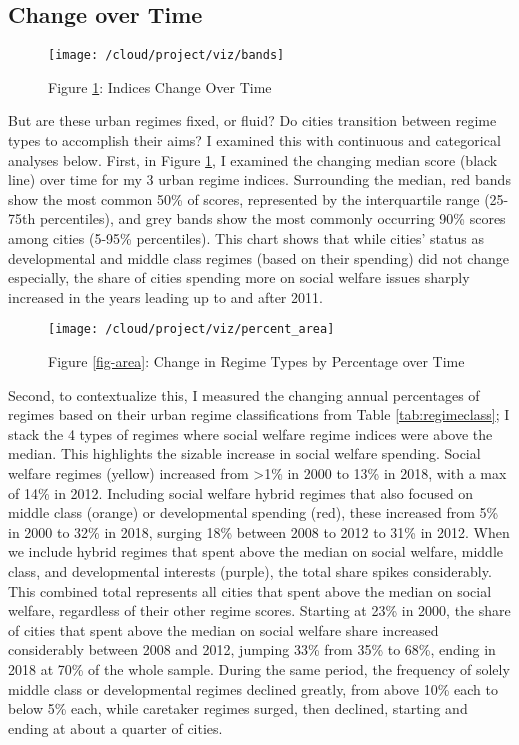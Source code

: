 \documentclass[preprint, 3p,
authoryear]{elsarticle} %
\begin{document}
\hypertarget{change-over-time}{%
\subsection{Change over Time}\label{change-over-time}}

\begin{figure}
\texttt{[image: /cloud/project/viz/bands]} \caption{Figure \ref{fig:bands}\label{fig:bands}: Indices Change Over Time}\label{fig:bands}
\end{figure}

But are these urban regimes fixed, or fluid? Do cities transition
between regime types to accomplish their aims? I examined this with
continuous and categorical analyses below. First, in Figure
\ref{fig:bands}, I examined the changing median score (black line) over
time for my 3 urban regime indices. Surrounding the median, red bands
show the most common 50\% of scores, represented by the interquartile
range (25-75th percentiles), and grey bands show the most commonly
occurring 90\% scores among cities (5-95\% percentiles). This chart
shows that while cities' status as developmental and middle class
regimes (based on their spending) did not change especially, the share
of cities spending more on social welfare issues sharply increased in
the years leading up to and after 2011.

\begin{figure}
\texttt{[image: /cloud/project/viz/percent\_area]} \caption{Figure \ref{fig-area}\label{fig-area}: Change in Regime Types by Percentage over Time}\label{fig:area}
\end{figure}

Second, to contextualize this, I measured the changing annual
percentages of regimes based on their urban regime classifications from
Table \ref{tab:regimeclass}; I stack the 4 types of regimes where social
welfare regime indices were above the median. This highlights the
sizable increase in social welfare spending. Social welfare regimes
(yellow) increased from \textgreater1\% in 2000 to 13\% in 2018, with a
max of 14\% in 2012. Including social welfare hybrid regimes that also
focused on middle class (orange) or developmental spending (red), these
increased from 5\% in 2000 to 32\% in 2018, surging 18\% between 2008 to
2012 to 31\% in 2012. When we include hybrid regimes that spent above
the median on social welfare, middle class, and developmental interests
(purple), the total share spikes considerably. This combined total
represents all cities that spent above the median on social welfare,
regardless of their other regime scores. Starting at 23\% in 2000, the
share of cities that spent above the median on social welfare share
increased considerably between 2008 and 2012, jumping 33\% from 35\% to
68\%, ending in 2018 at 70\% of the whole sample. During the same
period, the frequency of solely middle class or developmental regimes
declined greatly, from above 10\% each to below 5\% each, while
caretaker regimes surged, then declined, starting and ending at about a
quarter of cities.
\end{document}
